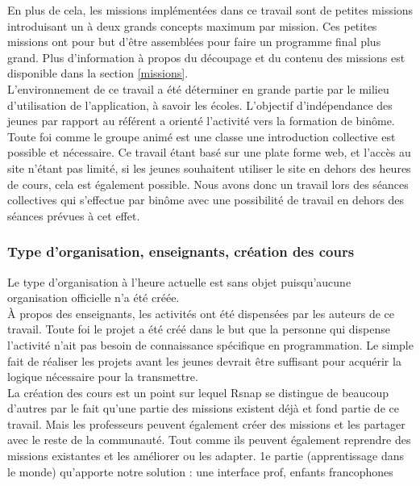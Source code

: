 En plus de cela, les missions implémentées dans ce travail sont de petites missions introduisant un à deux grands concepts maximum par mission. Ces petites missions ont pour but d'être assemblées pour faire un programme final plus grand. Plus d'information à propos du découpage et du contenu des missions est disponible dans la section \ref{missions}.\\

L'environnement de ce travail a été déterminer en grande partie par le milieu d'utilisation de l'application, à savoir les écoles. L'objectif d'indépendance des jeunes par rapport au référent a orienté l'activité vers la formation de binôme. Toute foi comme le groupe animé est une classe une introduction collective est possible et nécessaire. Ce travail étant basé sur une plate forme web, et l'accès au site n'étant pas limité, si les jeunes souhaitent utiliser le site en dehors des heures de cours, cela est également possible.
Nous avons donc un travail lors des séances collectives qui s'effectue par binôme avec une possibilité de travail en dehors des séances prévues à cet effet.

\subsubsection{Type d'organisation, enseignants, création des cours}
Le type d'organisation à l'heure actuelle est sans objet puisqu'aucune organisation officielle n'a été créée.\\

À propos des enseignants, les activités ont été dispensées par les auteurs de ce travail. Toute foi le projet a été créé dans le but que la personne qui dispense l'activité n'ait pas besoin de connaissance spécifique en programmation. Le simple fait de réaliser les projets avant les jeunes devrait être suffisant pour acquérir la logique nécessaire pour la transmettre.\\

La création des cours est un point sur lequel Rsnap se distingue de beaucoup d'autres par le fait qu'une partie des missions existent déjà et fond partie de ce travail. Mais les professeurs peuvent également créer des missions et les partager avec le reste de la communauté. Tout comme ils peuvent également reprendre des missions existantes et les améliorer ou les adapter. %
1e partie (apprentissage dans le monde) qu'apporte notre solution : une interface prof, enfants francophones

